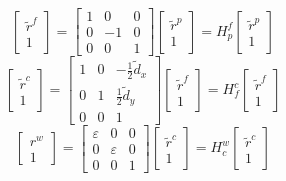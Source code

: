 \documentclass[12pt, a4paper]
{article}
\providecommand{\tr}{\tilde{r}}
\providecommand{\inert}{w}
\begin{document}
\begin{equation}
\begin{bmatrix}
\tr^f\\
1
\end{bmatrix} = \begin{bmatrix}
1 & 0 & 0\\
0 & -1 & 0\\
0& 0 & 1
\end{bmatrix}\begin{bmatrix}
\tr^p\\1
\end{bmatrix}=H^f_p \begin{bmatrix}
\tr^p\\1
\end{bmatrix}
\end{equation}
\begin{equation}
\begin{bmatrix}
\tr^c\\
1
\end{bmatrix} = \begin{bmatrix}
1 & 0 & -\frac{1}{2}\tilde{d}_x\\
0 & 1 & \frac{1}{2}\tilde{d}_y\\
0& 0 & 1
\end{bmatrix}\begin{bmatrix}
\tr^f\\1
\end{bmatrix}=H^c_f \begin{bmatrix}
\tr^f\\1
\end{bmatrix}
\end{equation}
\begin{equation}
\begin{bmatrix}
r^{\inert}\\
1
\end{bmatrix} = \begin{bmatrix}
\varepsilon & 0 & 0\\
0 & \varepsilon & 0\\
0& 0 & 1
\end{bmatrix}\begin{bmatrix}
\tr^c\\1
\end{bmatrix}=H^{\inert}_c \begin{bmatrix}
\tr^c\\1
\end{bmatrix}
\end{equation}
\end{document}
